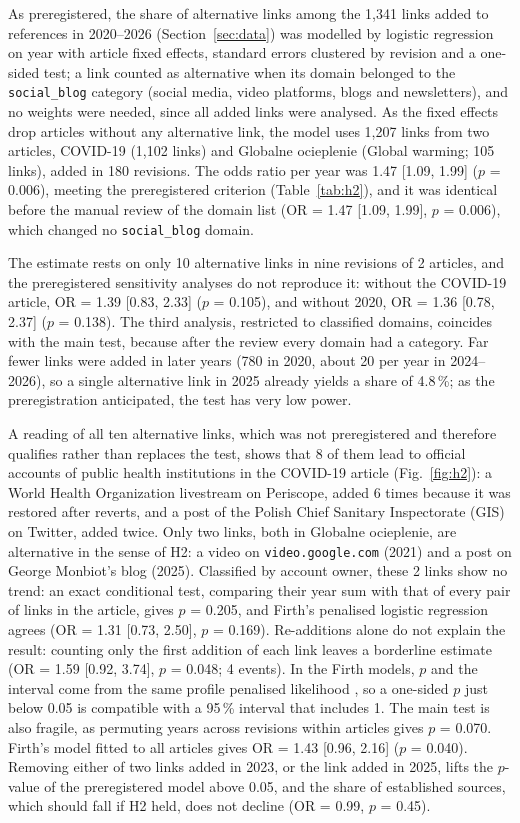 \documentclass[10pt,a4paper]{article}
\newcommand{\kod}[1]{\texttt{#1}}
\begin{document}
As preregistered, the share of alternative links among the 1,341 links added to
references in 2020--2026 (Section~\ref{sec:data}) was modelled by logistic regression on year with
article fixed effects, standard errors clustered by revision and a one-sided test; a link
counted as alternative when its domain belonged to the \kod{social\_blog} category (social
media, video platforms, blogs and newsletters), and no weights were needed, since all added
links were analysed. As the fixed effects drop articles without any alternative link, the
model uses 1,207 links from two articles, COVID-19 (1,102 links) and
Globalne ocieplenie (Global warming; 105 links), added in 180 revisions. The odds ratio per
year was 1.47 [1.09, 1.99] ($p$ = 0.006), meeting the preregistered criterion
(Table~\ref{tab:h2}), and it was identical before the manual review of the domain list
(OR = 1.47 [1.09, 1.99], $p$ = 0.006), which changed no
\kod{social\_blog} domain.

The estimate rests on only 10 alternative links in nine revisions
of 2 articles, and the preregistered sensitivity analyses do not
reproduce it: without the COVID-19 article, OR = 1.39 [0.83, 2.33]
($p$ = 0.105), and without 2020, OR = 1.36 [0.78, 2.37]
($p$ = 0.138). The third analysis, restricted to classified domains,
coincides with the main test, because after the review every domain had a category.
Far fewer links were added in later years (780 in 2020, about 20 per year in 2024--2026),
so a single alternative link in 2025 already yields a share of 4.8\,\%; as the
preregistration anticipated, the test has very low power.

A reading of all ten alternative links, which was not preregistered and therefore qualifies
rather than replaces the test, shows that 8 of them lead to official
accounts of public health institutions in the COVID-19 article (Fig.~\ref{fig:h2}): a World
Health Organization livestream on Periscope, added 6 times because it
was restored after reverts, and a post of the Polish Chief Sanitary Inspectorate (GIS) on
Twitter, added twice. Only two links, both in Globalne ocieplenie, are alternative in the
sense of H2: a video on \kod{video.google.com} (2021) and a post on George Monbiot's blog
(2025). Classified by account owner, these 2 links show no trend: an
exact conditional test, comparing their year sum with that of every pair of links in the
article, gives $p$ = 0.205, and Firth's penalised logistic regression
\cite{firth1993} agrees (OR = 1.31 [0.73, 2.50], $p$ = 0.169). Re-additions alone
do not explain the result: counting only the first addition of each link leaves a
borderline estimate (OR = 1.59 [0.92, 3.74], $p$ = 0.048; 4
events). In the Firth models, $p$ and the interval come from the same profile penalised
likelihood \cite{heinze2002}, so a one-sided $p$ just below 0.05 is compatible with a
95\,\% interval that includes 1. The main test is also fragile, as permuting years across
revisions within articles gives $p$ = 0.070.
Firth's model fitted to all articles gives OR = 1.43 [0.96, 2.16] ($p$ = 0.040).
Removing either of two links added in 2023, or the link added in 2025, lifts the $p$-value
of the preregistered model above 0.05, and the share of established sources, which should
fall if H2 held, does not decline (OR = 0.99, $p$ = 0.45).
\end{document}
